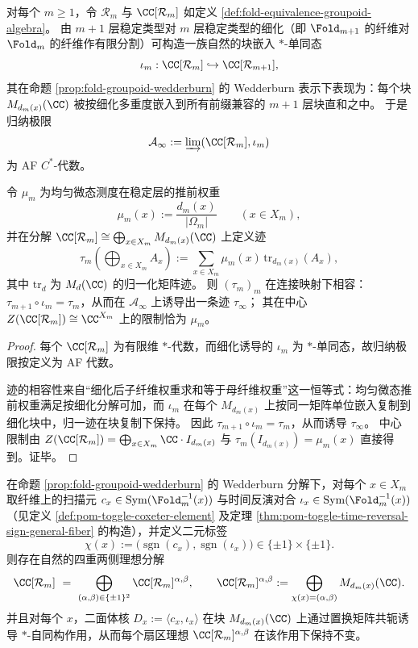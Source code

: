 \begin{theorem}\label{thm:fold-groupoid-af-inductive-limit-holographic-trace}
对每个 \(m\ge 1\)，令 \(\mathcal R_m\) 与 \(\CC[\mathcal R_m]\) 如定义 \ref{def:fold-equivalence-groupoid-algebra}。
由 \(m+1\) 层稳定类型对 \(m\) 层稳定类型的细化（即 \(\Fold_{m+1}\) 的纤维对 \(\Fold_m\) 的纤维作有限分割）可构造一族自然的块嵌入 \(\ast\)-单同态
\[
\iota_m:\CC[\mathcal R_m]\hookrightarrow \CC[\mathcal R_{m+1}],
\]
其在命题 \ref{prop:fold-groupoid-wedderburn} 的 Wedderburn 表示下表现为：每个块 \(M_{d_m(x)}(\CC)\) 被按细化多重度嵌入到所有前缀兼容的 \(m+1\) 层块直和之中。
于是归纳极限
\[
\mathcal A_\infty:=\varinjlim(\CC[\mathcal R_m],\iota_m)
\]
为 AF \(C^\ast\)-代数。
\par
令 \(\mu_m\) 为均匀微态测度在稳定层的推前权重
\[
\mu_m(x):=\frac{d_m(x)}{|\Omega_m|}\qquad(x\in X_m),
\]
并在分解 \(\CC[\mathcal R_m]\cong\bigoplus_{x\in X_m}M_{d_m(x)}(\CC)\) 上定义迹
\[
\tau_m\!\left(\bigoplus_{x\in X_m}A_x\right)
:=\sum_{x\in X_m}\mu_m(x)\,\mathrm{tr}_{d_m(x)}(A_x),
\]
其中 \(\mathrm{tr}_d\) 为 \(M_d(\CC)\) 的归一化矩阵迹。
则 \((\tau_m)_m\) 在连接映射下相容：\(\tau_{m+1}\circ \iota_m=\tau_m\)，从而在 \(\mathcal A_\infty\) 上诱导出一条迹 \(\tau_\infty\)；
其在中心 \(Z(\CC[\mathcal R_m])\cong \CC^{X_m}\) 上的限制恰为 \(\mu_m\)。
\end{theorem}
\begin{proof}
每个 \(\CC[\mathcal R_m]\) 为有限维 \(\ast\)-代数，而细化诱导的 \(\iota_m\) 为 \(\ast\)-单同态，故归纳极限按定义为 AF 代数。
\par
迹的相容性来自“细化后子纤维权重求和等于母纤维权重”这一恒等式：均匀微态推前权重满足按细化分解可加，而 \(\iota_m\) 在每个 \(M_{d_m(x)}\) 上按同一矩阵单位嵌入复制到细化块中，归一迹在块复制下保持。
因此 \(\tau_{m+1}\circ\iota_m=\tau_m\)，从而诱导 \(\tau_\infty\)。
中心限制由 \(Z(\CC[\mathcal R_m])=\bigoplus_{x\in X_m}\CC\cdot I_{d_m(x)}\) 与 \(\tau_m(I_{d_m(x)})=\mu_m(x)\) 直接得到。证毕。
\end{proof}

\begin{proposition}\label{prop:fold-groupoid-z2x2-sector-by-orientation}
在命题 \ref{prop:fold-groupoid-wedderburn} 的 Wedderburn 分解下，对每个 \(x\in X_m\) 取纤维上的扫描元 \(c_x\in\mathrm{Sym}(\Fold_m^{-1}(x))\) 与时间反演对合 \(\iota_x\in\mathrm{Sym}(\Fold_m^{-1}(x))\)（见定义 \ref{def:pom-toggle-coxeter-element} 及定理 \ref{thm:pom-toggle-time-reversal-sign-general-fiber} 的构造），并定义二元标签
\[
\chi(x):=\bigl(\operatorname{sgn}(c_x),\operatorname{sgn}(\iota_x)\bigr)\in\{\pm 1\}\times\{\pm 1\}.
\]
则存在自然的四重两侧理想分解
\[
\CC[\mathcal{R}_m]\ =\ \bigoplus_{(\alpha,\beta)\in\{\pm 1\}^2}\CC[\mathcal{R}_m]^{\alpha,\beta},
\qquad
\CC[\mathcal{R}_m]^{\alpha,\beta}:=\bigoplus_{\chi(x)=(\alpha,\beta)} M_{d_m(x)}(\CC).
\]
并且对每个 \(x\)，二面体核 \(D_x:=\langle c_x,\iota_x\rangle\) 在块 \(M_{d_m(x)}(\CC)\) 上通过置换矩阵共轭诱导 \(\ast\)-自同构作用，从而每个扇区理想 \(\CC[\mathcal{R}_m]^{\alpha,\beta}\) 在该作用下保持不变。
\end{proposition}

